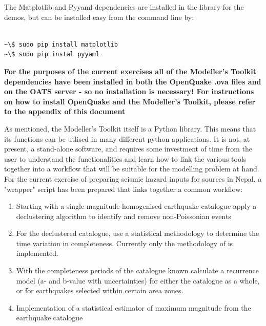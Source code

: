 The Matplotlib and Pyyaml dependencies are installed in the library for the demos, but can be installed easy from the command line by:
\begin{Verbatim}[frame=single, commandchars=\\\{\}, fontsize=\scriptsize]

~\$ sudo pip install matplotlib
~\$ sudo pip instal pyyaml

\end{Verbatim}

\textbf{For the purposes of the current exercises all of the Modeller's Toolkit dependencies have been installed in both the OpenQuake .ova files and on the OATS server - so no installation is necessary! For instructions on how to install OpenQuake and the Modeller's Toolkit, please refer to the appendix of this document}

As mentioned, the Modeller's Toolkit itself is a Python library. This means that its functions can be utlised in many different python applications. It is not, at present, a stand-alone software, and requires some investment of time from the user to understand the functionalities and learn how to link the various tools together into a workflow that will be suitable for the modelling problem at hand. For the current exercise of preparing seismic hazard inputs for sources in Nepal, a "wrapper" script has been prepared that links together a common workflow: 

\begin{enumerate}

\item Starting with a single magnitude-homogenised earthquake catalogue apply a declustering algorithm to identify and remove non-Poissonian events

\item For the declustered catalogue, use a statistical methodology to determine the time variation in completeness. Currently only the methodology of \cite{Stepp1971} is implemented.

\item With the completeness periods of the catalogue known calculate a \cite{GutenbergRichter1944} recurrence model (a- and b-value with uncertainties) for either the catalogue as a whole, or for earthquakes selected within certain area zones.

\item Implementation of a statistical estimator of maximum magnitude from the earthquake catalogue  

\end{enumerate}

